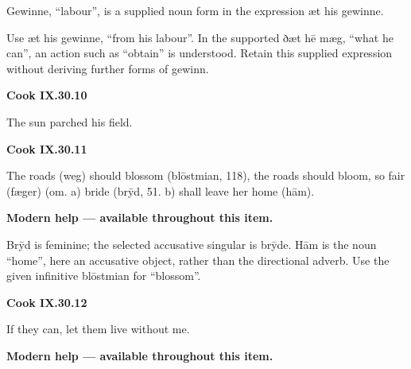 Gewinne, “labour”, is a supplied noun form in the expression æt his gewinne.

Use æt his gewinne, “from his labour”. In the supported ðæt hē mæg, “what he can”, an action such as “obtain” is understood. Retain this supplied expression without deriving further forms of gewinn.

\par\begin{minipage}{\linewidth}\raggedright
\textbf{Cook IX.30.10}

The sun parched his field.

\end{minipage}\par\addvspace{4pt}

\par\begin{minipage}{\linewidth}\raggedright
\textbf{Cook IX.30.11}

The roads (weg) should blossom (blōstmian, 118), the roads should bloom, so fair (fæger) (om. a) bride (brȳd, 51. b) shall leave her home (hām).

\textbf{Modern help — available throughout this item.}

\end{minipage}\par\addvspace{4pt}

Brȳd is feminine; the selected accusative singular is brȳde. Hām is the noun “home”, here an accusative object, rather than the directional adverb. Use the given infinitive blōstmian for “blossom”.

\par\begin{minipage}{\linewidth}\raggedright
\textbf{Cook IX.30.12}

If they can, let them live without me.

\textbf{Modern help — available throughout this item.}

\end{minipage}\par\addvspace{4pt}

